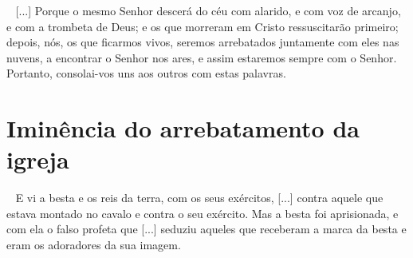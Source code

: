 \documentclass[12pt,aspectratio=169]{beamer}
\newcommand{\ver}[1]{%
    \raisebox{0.50ex}{%
        \scalebox{1.1}{%
            \pmb{\textbf{\textcolor{BSpbg}{#1}}}%
        }%
    }%
}
\newcommand{\QUOTE}[1]{%
    \par\noindent\hspace*{0.1\linewidth}%
    \begin{minipage}{0.8\linewidth}%
        \linespread{1.35}\large{#1}%
    \end{minipage}%
}
\newcommand{\WIDEQUOTE}[1]{%
    \par\noindent\hspace*{0.02\linewidth}%
    \begin{minipage}{0.92\linewidth}%
        \linespread{1.25}\large{#1}%
    \end{minipage}%
}
\newcommand{\ORA}[1]{{\textcolor{TXora}{#1}}}
\newcommand{\YEL}[1]{{\textcolor{TXyel}{#1}}}
\newcommand{\GRE}[1]{{\textcolor{TXgre}{#1}}}
\newcommand{\CYA}[1]{{\textcolor{TXcya}{#1}}}
\newcommand{\BLU}[1]{{\textcolor{TXblu}{#1}}}
\newcommand{\MAG}[1]{{\textcolor{TXmag}{#1}}}
\newcommand{\BRI}[1]{{\textcolor{BSpbg}{#1}}}   %
\begin{document}
    \begin{frame}
        \WIDEQUOTE{%
            \ver{(ARC) 1Ts~4.13--18}~%
            [...] Porque \MAG{o mesmo Senhor descerá do céu com alarido}, e \MAG{com voz  de
            arcanjo}, e \MAG{com a trombeta de Deus};  e  \YEL{os  que  morreram  em  Cristo
            ressuscitarão primeiro};  depois,  nós,  os  que  ficarmos  vivos,  \CYA{seremos
            arrebatados juntamente com eles} nas  nuvens,  a  \BRI{encontrar  o  Senhor  nos
            ares}, e assim \BLU{estaremos sempre com o Senhor}. Portanto, \BRI{consolai-vos}
            uns aos outros com estas palavras.
        }
    \end{frame}

\section{Iminência do arrebatamento da igreja}

    \begin{frame}
        \QUOTE{%
            \ver{(ARA) Ap~19.19,20}~%
            E vi a \YEL{besta} e os reis da terra,  com  os  seus  exércitos,  [...]  contra
            \BRI{aquele que estava montado no  cavalo}  e  contra  o  seu  exército.  Mas  a
            \YEL{besta} foi aprisionada, e com ela o \ORA{falso profeta} que  [...]  seduziu
            aqueles que receberam a \MAG{marca da besta} e eram os  adoradores  da  \GRE{sua
            imagem}. \\[\bigskipamount]
        }
    \end{frame}



\end{document}
